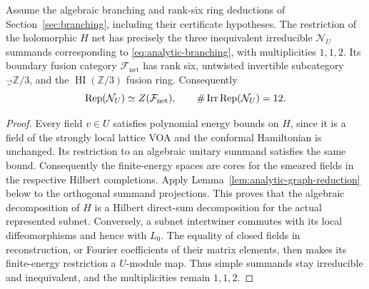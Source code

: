 \begin{proposition}
\label{clm:analytic-net-count}
Assume the algebraic branching and rank-six ring deductions of
Section~\ref{sec:branching}, including their certificate hypotheses.
The restriction of the holomorphic $H$ net has precisely the three
inequivalent irreducible $\mathcal N_U$ summands corresponding to
\eqref{eq:analytic-branching}, with multiplicities $1,1,2$.
Its boundary fusion category $\mathcal F_{\mathrm{net}}$ has rank six,
untwisted invertible subcategory $\Vec_{\mathbb Z/3}$, and the
$\operatorname{HI}(\mathbb Z/3)$ fusion ring.  Consequently
\[
 \operatorname{Rep}(\mathcal N_U)\simeq Z(\mathcal F_{\mathrm{net}}),
 \qquad
 \#\operatorname{Irr}\operatorname{Rep}(\mathcal N_U)=12.
\]
\end{proposition}
\begin{proof}
Every field $v\in U$ satisfies polynomial energy bounds on $H$, since
it is a field of the strongly local lattice VOA and the conformal
Hamiltonian is unchanged.  Its restriction to an algebraic unitary
summand satisfies the same bound.  Consequently the finite-energy
spaces are cores for the smeared fields in the respective Hilbert
completions.  Apply Lemma~\ref{lem:analytic-graph-reduction} below to
the orthogonal summand projections.  This proves that the algebraic
decomposition of $H$ is a Hilbert direct-sum decomposition for the
actual represented subnet.  Conversely, a subnet intertwiner commutes
with its local diffeomorphisms and hence with $L_0$.  The equality of
closed fields in reconstruction, or Fourier coefficients of their
matrix elements, then makes its finite-energy restriction a
$U$-module map.  Thus simple summands stay irreducible and inequivalent,
and the multiplicities remain $1,1,2$.


\end{proof}
